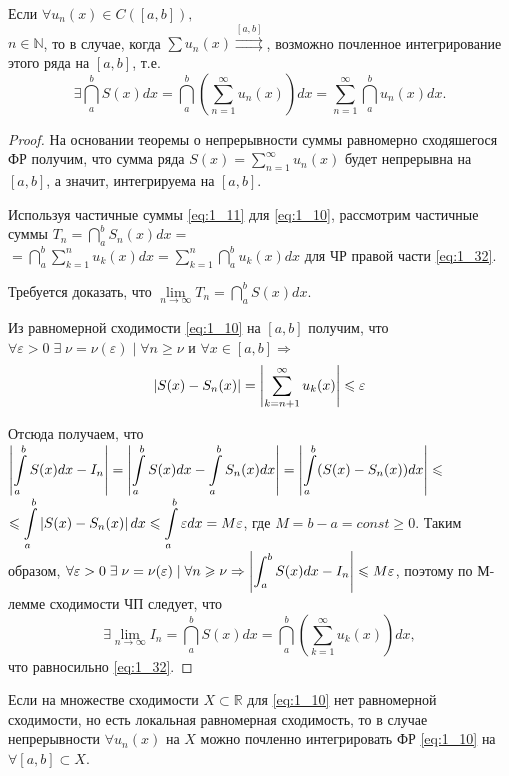 \begin{theorem}
	Если $\forall u_n(x) \in C([a,b]), $ \\ $n \in \mathbb{N}$, то в случае, когда $\sum u_n(x) \overset{[a,b]}{\rightrightarrows}$, возможно почленное интегрирование этого ряда на $[a,b]$, т.е.
	\begin{equation}
	\label{eq:1_32}
	\exists \dint\limits_a^b S(x)dx = \dint\limits_a^b \left(\sum_{n=1}^{\infty}u_n(x)\right)dx = \sum_{n=1}^{\infty} \dint\limits_a^b u_n(x)dx.
	\end{equation}
\end{theorem}
\begin{proof}
	На основании теоремы о непрерывности суммы равномерно сходяшегося ФР получим, что сумма ряда $S(x) = \sum\limits_{n=1}^{\infty}u_n(x)$ будет непрерывна на $[a,b]$, а значит, интегрируема на $[a,b]$.

	Используя частичные суммы \eqref{eq:1_11} для \eqref{eq:1_10}, рассмотрим частичные суммы $T_n = \dint\limits_a^b S_n(x)dx  =$ \\$= 	\dint\limits_a^b \sum_{k=1}^{n} u_k(x)dx = \sum\limits_{k=1}^{n} \dint\limits_a^b u_k(x)dx$ для ЧР правой части \eqref{eq:1_32}.

	Требуется доказать, что $\lim\limits_{n \to \infty} T_n = \dint\limits_a^b S(x)dx$.

    Из равномерной сходимости \eqref{eq:1_10} на $[a,b]$ получим, что $\forall \varepsilon > 0 \; \exists \; \nu = \nu(\varepsilon) \; | \; \forall n \geqslant \nu $ и $ \forall x \in [a,b] \Rightarrow$
	\begin{equation}
	\label{eq:1_33}
	 	\left\lvert S(x) - S_n(x) \right\rvert = \left\lvert \sum_{k = n+1}^{\infty} u_k(x) \right\rvert \leqslant \varepsilon
	\end{equation}

	Отсюда получаем, что $\left\lvert \displaystyle\int\limits_a^b S(x)dx - I_n \right\rvert = \left\lvert \displaystyle\int\limits_a^b S(x)dx - \displaystyle\int\limits_a^b S_n(x)dx \right\rvert =  \left\lvert \displaystyle\int\limits_a^b (S(x) - S_n(x))dx \right\rvert \leqslant $ \\ $\leqslant \displaystyle\int\limits_a^b \left\lvert S(x) - S_n(x) \right\rvert dx \leqslant \displaystyle\int\limits_a^b \varepsilon dx = M \varepsilon$, где $M = b - a = const \geqslant 0$. Таким образом, $\forall \varepsilon > 0 \; \exists \; \nu = \nu(\varepsilon) \; | \; \forall n \geqslant \nu \Rightarrow \left\lvert \displaystyle\int_a^b S(x) dx - I_n \right\rvert \leqslant M \varepsilon$, поэтому по М-лемме сходимости ЧП следует, что
	\begin{equation*}
    	\exists \lim\limits_{n \to \infty} I_n = \dint\limits_a^b S(x)dx = \dint\limits_a^b \left(\sum\limits_{k=1}^{\infty} u_k(x)\right) dx,
	\end{equation*}
	что равносильно \eqref{eq:1_32}.
\end{proof}

\begin{note}
	Если на множестве сходимости $X \subset \mathbb{R}$ для \eqref{eq:1_10} нет равномерной сходимости, но есть локальная равномерная сходимость, то в случае непрерывности $\forall u_n(x)$ на $X$ можно почленно интегрировать ФР \eqref{eq:1_10}	на $\forall [a,b] \subset X$.
\end{note}
